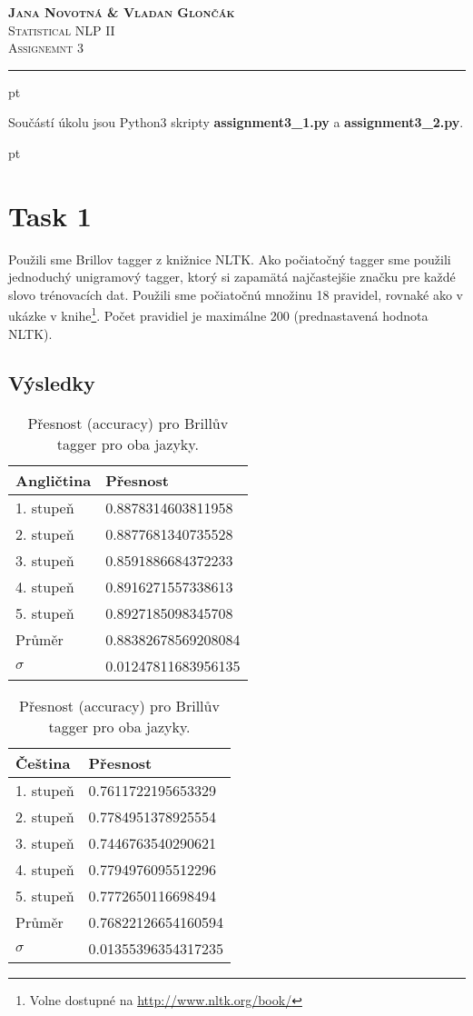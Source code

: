 \documentclass[a4paper, 10.5pt]{article}
\begin{document}
\noindent
\large\textsc{\textbf{Jana Novotná \& Vladan Glončák}}  \\
\normalsize \textsc{Statistical NLP II}\\
\textsc{Assignemnt 3}

\noindent\rule[0.5ex]{\linewidth}{1pt}

\newcommand{\norm}[1]{\left\lVert#1\right\rVert}

 pt

Součástí úkolu jsou Python3 skripty \textbf{assignment3\_1.py} a \textbf{assignment3\_2.py}.

 pt

\section*{Task 1}

Použili sme Brillov tagger z knižnice NLTK.
Ako počiatočný tagger sme použili jednoduchý unigramový tagger, ktorý si  zapamätá najčastejšie značku pre každé slovo trénovacích dat.
Použili sme počiatočnú množinu 18 pravidel, rovnaké ako v ukázke v knihe\footnote{Volne dostupné na \url{http://www.nltk.org/book/}}. Počet pravidiel je maximálne 200 (prednastavená hodnota NLTK).

\subsection*{Výsledky}

\vskip 10pt

\begin{table}[H]
\centering
\begin{tabular}{ll}
\toprule
\textbf{Angličtina} & \textbf{Přesnost} \\
\midrule
1. stupeň & 0.8878314603811958 \\
2. stupeň & 0.8877681340735528 \\
3. stupeň & 0.8591886684372233 \\
4. stupeň & 0.8916271557338613 \\
5. stupeň & 0.8927185098345708 \\
\midrule
Průměr   & 0.88382678569208084 \\
$\sigma$ & 0.01247811683956135 \\
\bottomrule
\end{tabular}
\hskip 50pt
\begin{tabular}{ll}
\toprule
\textbf {Čeština} & \textbf{Přesnost} \\
\midrule
1. stupeň & 0.7611722195653329 \\
2. stupeň & 0.7784951378925554 \\
3. stupeň & 0.7446763540290621 \\
4. stupeň & 0.7794976095512296 \\
5. stupeň & 0.7772650116698494 \\
\midrule
Průměr   & 0.76822126654160594 \\
$\sigma$ & 0.01355396354317235 \\
\bottomrule
\end{tabular}
\caption{Přesnost (accuracy) pro Brillův tagger pro oba jazyky.}
\label{eng_big}
\end{table}
\end{document}
